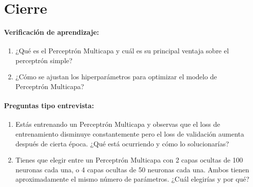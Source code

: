 \documentclass[a4,11pt]{aleph-notas}
\begin{document}
\section*{Cierre}

\paragraph{Verificación de aprendizaje:}
\begin{enumerate}[leftmargin=*]
    \item ¿Qué es el Perceptrón Multicapa y cuál es su principal ventaja sobre el perceptrón simple?
    
    \item ¿Cómo se ajustan los hiperparámetros para optimizar el modelo de Perceptrón Multicapa?
\end{enumerate}

\paragraph{Preguntas tipo entrevista:}
\begin{enumerate}[leftmargin=*]
    \item Estás entrenando un Perceptrón Multicapa y observas que el loss de entrenamiento disminuye constantemente pero el loss de validación aumenta después de cierta época. ¿Qué está ocurriendo y cómo lo solucionarías?
    
    \item Tienes que elegir entre un Perceptrón Multicapa con 2 capas ocultas de 100 neuronas cada una, o 4 capas ocultas de 50 neuronas cada una. Ambos tienen aproximadamente el mismo número de parámetros. ¿Cuál elegirías y por qué?
\end{enumerate}
\end{document}

